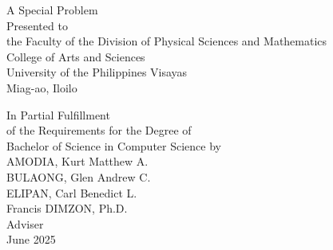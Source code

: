 \begin{titlepage}
\centering


\vspace{0.875cm}
A Special Problem\\
Presented to\\
the Faculty of the Division of Physical Sciences and Mathematics\\
College of Arts and Sciences\\
University of the Philippines Visayas\\
Miag-ao, Iloilo

\vspace{0.875cm}
In Partial Fulfillment\\
of the Requirements for the Degree of\\
Bachelor of Science in Computer Science
\vspace{1.75cm}
by\\

\vspace{0.1cm}
AMODIA, Kurt Matthew A.  \\
BULAONG, Glen Andrew C. \\
ELIPAN, Carl Benedict L.   \\

\vspace{0.875cm}
Francis DIMZON, Ph.D. \\
Adviser\\


\vspace{0.875cm}
June 2025
\end{titlepage}
